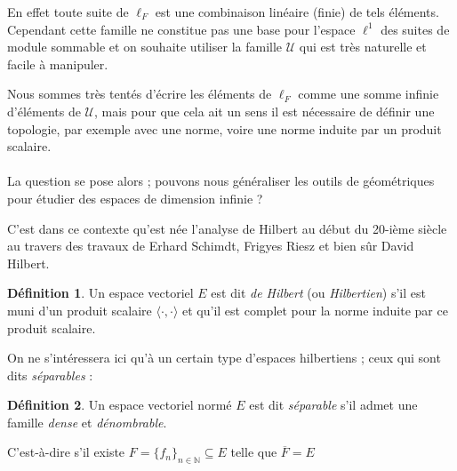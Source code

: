 \documentclass[]{article}
\theoremstyle{remark}
\theoremstyle{definition}
\newtheorem{mydef}{Définition}
\begin{document}
	En effet toute suite de $\ell_F$ est une combinaison linéaire (finie) de tels éléments. Cependant cette famille ne constitue pas une base pour l'espace $\ell^1$ des suites de module sommable et on souhaite utiliser la famille $\mathcal{U}$ qui est très naturelle et facile à manipuler.
	
	Nous sommes très tentés d'écrire les éléments de $\ell_F$ comme une somme infinie d'éléments de $\mathcal{U}$, mais pour que cela ait un sens il est nécessaire de définir une topologie, par exemple avec une norme, voire une norme induite par un produit scalaire.
	
	\paragraph*{}
	
	La question se pose alors ; pouvons nous généraliser les outils de géométriques pour étudier des espaces de dimension infinie ?
	
	C'est dans ce contexte qu'est née l'analyse de Hilbert au début du 20-ième siècle au travers des travaux de Erhard Schimdt, Frigyes Riesz et bien sûr David Hilbert.
	
	\begin{mydef}
		Un espace vectoriel $E$ est dit \textit{de Hilbert} (ou \textit{Hilbertien}) s'il est muni d'un produit scalaire $\langle \cdot, \cdot \rangle$ et qu'il est complet pour la norme induite par ce produit scalaire.
	\end{mydef}
	
	On ne s'intéressera ici qu'à un certain type d'espaces hilbertiens ; ceux qui sont dits \textit{séparables} :
	
	\begin{mydef}
		Un espace vectoriel normé $E$ est dit \textit{séparable} s'il admet une famille \textit{dense} et \textit{dénombrable}.
		
		C'est-à-dire s'il existe $F = \{f_n\}_{n \in \mathbb{N}} \subseteq E$ telle que $\overline{F} = E$
	\end{mydef}
	
\end{document}
